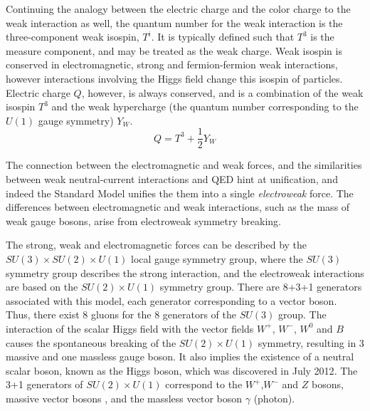 \documentclass[11pt,a4paper,openright,twoside]{report}
\begin{document}
Continuing the analogy between the electric charge and the color charge to the weak interaction as well, the quantum number for the weak interaction is the three-component weak isospin, $T^i$. It is typically defined such that $T^3$ is the measure component, and may be treated as the weak charge. Weak isospin is conserved in electromagnetic, strong and fermion-fermion weak interactions, however interactions involving the Higgs field change this isospin of particles. Electric charge $Q$, however, is always conserved, and is a combination of the weak isospin $T^3$ and the weak hypercharge (the quantum number corresponding to the $U(1)$ gauge symmetry) $Y_W$.
$$
Q = T^3 + \frac{1}{2}Y_W
$$

The connection between the electromagnetic and weak forces, and the similarities between weak neutral-current interactions and QED hint at unification, and indeed the Standard Model unifies the them into a single \textit{electroweak} force. The differences between electromagnetic and weak interactions, such as the mass of weak gauge bosons, arise from electroweak symmetry breaking.

The strong, weak and electromagnetic forces can be described by the $SU(3)\times SU(2)\times U(1)$ local gauge symmetry group, where the $SU(3)$ symmetry group describes the strong interaction, and the electroweak interactions are based on the $SU(2)\times U(1)$ symmetry group. There are 8+3+1 generators associated with this model, each generator corresponding to a vector boson. Thus, there exist 8 gluons for the 8 generators of the $SU(3)$ group. The interaction of the scalar Higgs field with the vector fields $W^+$, $W^-$, $W^0$ and $B$ causes the spontaneous breaking of the $SU(2)\times U(1)$ symmetry, resulting in 3 massive and one massless gauge boson. It also implies the existence of a neutral scalar boson, known as the Higgs boson, which was discovered in July 2012\cite{Higgs}. The 3+1 generators of $SU(2)\times U(1)$ correspond to the $W^+$,$W^-$ and $Z$ bosons, massive vector bosons , and the massless vector boson $\gamma$ (photon).
\end{document}
